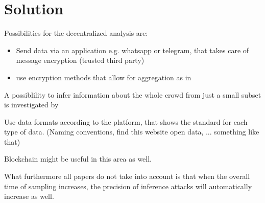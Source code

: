 \chapter{Solution}\label{chapter:solution}

Possibilities for the decentralized analysis are:
\begin{itemize}
	\item Send data via an application e.g. whatsapp or telegram, that takes care of message encryption (trusted third party)
	\item use encryption methods that allow for aggregation as in \parencite{crowdsourcing}
\end{itemize}

A possiblility to infer information about the whole crowd from just a small subset is investigated by \parencite{subset}

Use data formats according to the platform, that shows the standard for each type of data. (Naming conventions, find this website open data, ... something like that)

Blockchain might be useful in this area as well.

What furthermore all papers do not take into account is that when the overall time of sampling increases, the precision of inference attacks will automatically increase as well. 